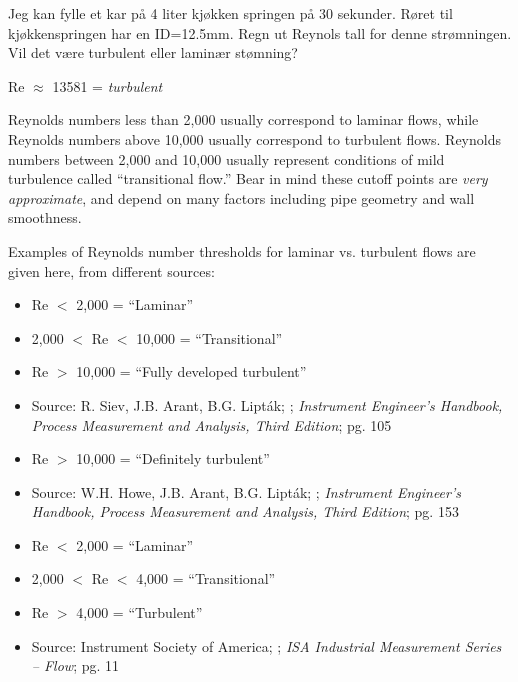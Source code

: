 

Jeg kan fylle et kar på 4 liter kjøkken springen på 30 sekunder. Røret til kjøkkenspringen har en ID=12.5mm. Regn ut Reynols tall for denne strømningen. Vil det være turbulent eller laminær stømning?








Re $\approx$ 13581 = {\it turbulent}

\vskip 10pt

Reynolds numbers less than 2,000 usually correspond to laminar flows, while Reynolds numbers above 10,000 usually correspond to turbulent flows.  Reynolds numbers between 2,000 and 10,000 usually represent conditions of mild turbulence called ``transitional flow.''  Bear in mind these cutoff points are {\it very approximate}, and depend on many factors including pipe geometry and wall smoothness.

Examples of Reynolds number thresholds for laminar vs. turbulent flows are given here, from different sources:

\begin{itemize}
\goodbreak
\item{} Re $<$ 2,000 = ``Laminar''
\item{} 2,000 $<$ Re $<$ 10,000 = ``Transitional''
\item{} Re $>$ 10,000 = ``Fully developed turbulent''
\item{} Source: R. Siev, J.B. Arant, B.G. Lipt\'ak; ; {\it Instrument Engineer's Handbook, Process Measurement and Analysis, Third Edition}; pg. 105
\end{itemize}

\begin{itemize}
\goodbreak
\item{} Re $>$ 10,000 = ``Definitely turbulent''
\item{} Source: W.H. Howe, J.B. Arant, B.G. Lipt\'ak; ; {\it Instrument Engineer's Handbook, Process Measurement and Analysis, Third Edition}; pg. 153
\end{itemize}

\begin{itemize}
\goodbreak
\item{} Re $<$ 2,000 = ``Laminar''
\item{} 2,000 $<$ Re $<$ 4,000 = ``Transitional''
\item{} Re $>$ 4,000 = ``Turbulent''
\item{} Source: Instrument Society of America; ; {\it ISA Industrial Measurement Series -- Flow}; pg. 11
\end{itemize}

